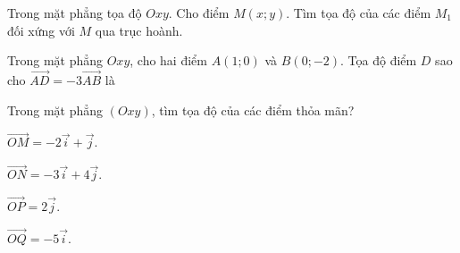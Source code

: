 \begin{bt}%
Trong mặt phẳng tọa độ $Oxy$. Cho điểm $M(x;y)$. Tìm tọa độ của các điểm $M_1$ đối xứng với $M$ qua trục hoành.
\end{bt}

\begin{bt}%
	Trong mặt phẳng $Oxy$, cho hai điểm $A(1;0)$ và $B(0;-2)$. Tọa độ điểm $D$ sao cho $\overrightarrow{AD}=-3\overrightarrow{AB}$ là
\end{bt}

\begin{bt}%
    Trong mặt phẳng $(Oxy)$, tìm tọa độ của các điểm thỏa mãn?
    \begin{listEX}[2]
        \item $\overrightarrow{OM}=-2\overrightarrow{i}+\overrightarrow{j}$.
        \item $\overrightarrow{ON}=-3\overrightarrow{i}+4\overrightarrow{j}$.
        \item $\overrightarrow{OP}=2\overrightarrow{j}$.
        \item $\overrightarrow{OQ}=-5\overrightarrow{i}$.
    \end{listEX}
\end{bt}


